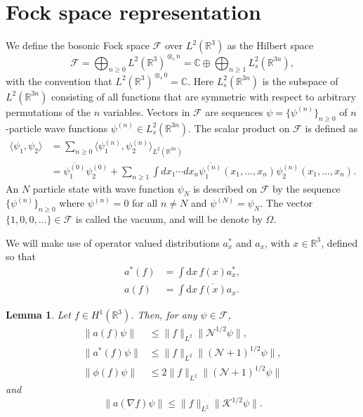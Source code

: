\documentclass[11pt,a4paper]{scrartcl}
\newtheorem{lem}[thm]{Lemma}
\newcommand{\R}{\mathds{R}}
\newcommand{\N}{\mathcal{N}}
\newcommand{\di}{\textrm{d}}		%
\newcommand{\Ncal}{\mathcal{N}}		%
\newcommand{\Kcal}{\mathcal{K}}		%
\newcommand{\cc}[1]{\overline{#1}}	%
\newcommand{\norm}[1]{\lVert#1\rVert}	%
\newcommand{\be}[1]{\begin{equation}\label{eq:#1}}	%
\newcommand{\ee}{\end{equation}}
\begin{document}
\tableofcontents


\newpage


\section{Fock space representation}


We define the bosonic Fock space $\mathcal{F}$ over $L^2(\R^3)$ as the Hilbert
space
\[
  \mathcal{F} = \bigoplus_{n \ge 0} L^2(\R^3)^{\otimes_s n} = \mathds{C}
  \oplus \bigoplus_{n \ge 1} L^2_s(\R^{3n}),
\]
with the convention that $L^2(\R^3)^{\otimes_s 0} = \mathds{C}$. Here
$L^2_s(\R^{3n})$ is the subspace of $L^2(\R^{3n})$ consisting of all functions
that are symmetric with respect to arbitrary permutations of the $n$
variables. Vectors in $\mathcal{F}$ are sequences $\psi = \{ \psi^{(n)} \}_{n
\ge 0}$ of $n$-particle wave functions $\psi^{(n)} \in L^2_s(\R^{3n})$. The
scalar product on $\mathcal{F}$ is defined as
\begin{align*}
  \langle \psi_1, \psi_2 \rangle & = \sum_{n \ge 0} \langle \psi_1^{(n)},
  \psi_2^{(n)} \rangle_{L^2(\R^{3n})} \\
  & = \overline{\psi_1^{(0)}} \psi_2^{(0)} + \sum_{n \ge 1} \int dx_1 \cdots
  dx_n \overline{\psi_1^{(n)}}(x_1, \dots, x_n) \psi_2^{(n)}(x_1, \dots, x_n).
\end{align*}
An $N$ particle state with wave function $\psi_N$ is described on
$\mathcal{F}$ by the sequence $\{ \psi^{(n)} \}_{n \ge 0}$ where $\psi^{(n)}
= 0$ for all $n \neq N$ and $\psi^{(N)} = \psi_N$. The vector $\{ 1, 0, 0,
\dots \} \in \mathcal{F}$ is called the vacuum, and will be denote by
$\Omega$.


We will make use of operator valued distributions $a_x^*$ and $a_x$, with $x
\in \R^3$, defined so that
\begin{equation}
  \label{a}
  \begin{aligned}
    a^*(f) & = \int \di x\, f(x) a^*_x, \\
      a(f) & = \int \di x\, \cc{f(x)} a_x.
  \end{aligned}
\end{equation}

\begin{lem}
  \label{l:a}
  Let $f \in H^1(\R^3)$. Then, for any $\psi \in \mathcal{F}$,
  \begin{equation}
    \label{aNorm}
    \begin{aligned}
      \norm{a(f)\psi} & \leq \norm{f}_{L^2} \norm{\Ncal^{1/2}\psi}, \\
      \norm{a^*(f)\psi} & \leq \norm{f}_{L^2} \norm{(\Ncal+1)^{1/2}\psi}, \\
      \norm{\phi(f) \psi} & \leq 2 \norm{f}_{L^2} \norm{(\N+1)^{1/2} \psi}
    \end{aligned}
  \end{equation}
and
\be{agradnorm}
\norm{a(\nabla f)\psi}  \leq \norm{f}_{L^2} \norm{\Kcal^{1/2}\psi}.
\ee
\end{lem}
\end{document}
